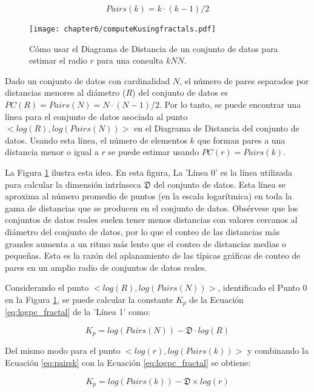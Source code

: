 \begin{equation}\label{eq:pairsk}
 Pairs(k) = k \cdot (k - 1) / 2 
\end {equation} 
 
\begin{figure}[htp]
\centering
 \texttt{[image: chapter6/computeKusingfractals.pdf]} 
 \caption{ Cómo usar el Diagrama  de Distancia de un conjunto de datos para estimar el radio $r$ para una consulta  $kNN$. } 
\label{fig:knnfractal}
\end{figure} 
Dado un conjunto de datos con cardinalidad $N$, el número de pares separados por distancias menores al diámetro ($R$) del conjunto de datos  es $PC (R) = Pairs (N) = N \cdot (N-1) / 2 $. Por lo tanto, se puede encontrar una línea  para el conjunto de datos asociada al punto $ <log (R), log (Pairs (N))>$ en el Diagrama de Distancia del conjunto de datos.  Usando esta línea, el número de elementos $k$ que forman pares a una distancia menor o igual a $r$ se puede estimar usando $PC (r) = Pairs (k)$. 

 La Figura \ref{fig:knnfractal} ilustra esta idea. En esta figura, La 'Línea 0' es la línea utilizada para calcular la dimensión intrínseca $\mathfrak{D}$ del  conjunto de datos. Esta línea se aproxima al número promedio de puntos (en la escala logarítmica) en toda la gama de distancias que se producen en el conjunto de datos. Obsérvese que los conjuntos de datos reales suelen tener menos distancias con valores cercanos al diámetro del conjunto de datos, por lo que el conteo de las distancias más grandes aumenta a un ritmo más lento que el conteo de distancias medias o pequeñas. Esta es la razón del aplanamiento de las típicas gráficas de conteo de pares en un amplio radio de conjuntos de datos reales.
  
Considerando el  punto $<log (R), log (Pairs (N))>$, identificado  el Punto  0 en la Figura \ref{fig:knnfractal}, se puede calcular la constante $K_p$ de la Ecuación \ref{eq:logpc_fractal} de la 'Línea 1' como:

\begin{equation}\label{eq:fractal_kd}
  K_p    = log (Pairs(N)) - \mathfrak{D} \cdot log (R) 	
\end{equation}

Del mismo modo para el punto $<log (r), log (Pairs (k))>$  y combinando la Ecuación \ref{eq:pairsk} con la Ecuación \ref{eq:logpc_fractal} se obtiene:
  
\begin{equation}\label{eq:fractal_kd0}
  K_p = log (Pairs (k)) - \mathfrak{D} \times log (r)
\end{equation}

